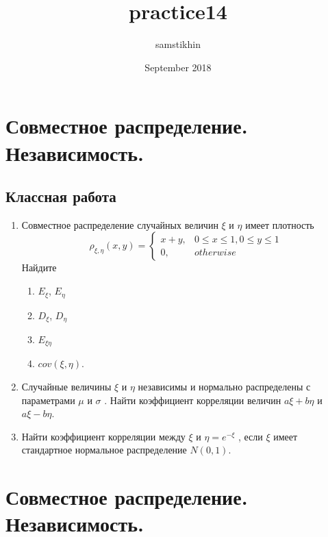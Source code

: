\documentclass[a4paper, 14pt]{extarticle}
\title{practice14}
\author{samstikhin}
\date{September 2018}
\begin{document}
\section*{Совместное распределение. Независимость.}
\subsection*{Классная работа}
\begin{enumerate}
\item Совместное распределение случайных величин $\xi$ и $\eta$ имеет плотность
$$\rho_{\xi,\eta}(x,y) =\left\{
	\begin{array}{cc}
	x+y, & 0\leq x\leq 1, 0\leq y\leq 1 \\
	0, & otherwise
	\end{array}\right.$$
Найдите 
\begin{enumerate}
\item $E_{\xi}$, $E_{\eta}$
\item $D_{\xi}$, $D_{\eta}$
\item $E_{\xi\eta}$
\item $cov(\xi,\eta)$.
\end{enumerate}
\item Случайные величины $\xi$ и $\eta$ независимы и нормально распределены с параметрами $\mu$ и $\sigma$ . Найти коэффициент корреляции величин
$a\xi + b\eta$ и $a\xi - b\eta$.
\item Найти коэффициент корреляции между $\xi$ и $\eta = e^{-\xi}$ , если 
$\xi$ имеет стандартное нормальное распределение $N(0,1)$.

\end{enumerate}

\newpage

\section*{Совместное распределение. Независимость.}
\end{document}
